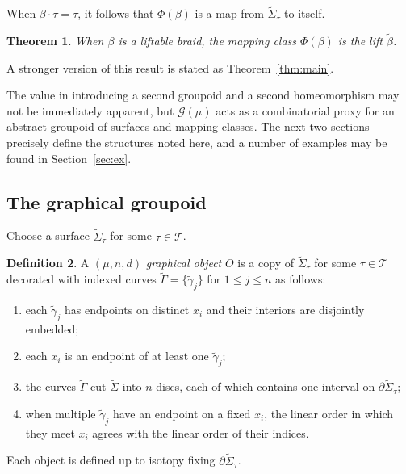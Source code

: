 \documentclass{amsart}
\newtheorem{theorem}{Theorem}[section]
\theoremstyle{definition}
\newtheorem{definition}[theorem]{Definition}
\def\ws{\widetilde{\Sigma}}
\begin{document}
When $\beta\cdot \tau=\tau$, it follows that $\Phi(\beta)$ is a map from $\ws_\tau$ to itself. 



\begin{theorem}\label{thm:premain} When $\beta$ is a liftable braid,  the mapping class $\Phi(\beta)$ is the lift $\widetilde{\beta}$.
\end{theorem} 

A stronger version of this result is stated as Theorem~\ref{thm:main}.

The value in introducing a second groupoid and a second homeomorphism may not be immediately apparent, but $\mathcal{G}(\mu)$ acts as a combinatorial proxy for an abstract groupoid of surfaces and mapping classes.  The next two sections precisely define the structures noted here, and a number of examples may be found in Section~\ref{sec:ex}.






\subsection{The graphical groupoid}\label{sec:gobj}

Choose a surface $\ws_\tau$ for some $\tau\in\mathcal{T}$.


\begin{definition}\label{def:graphobj}  A $(\mu, n, d)$ \textit{graphical object} $O$ is a copy of $\ws_\tau$ for some $\tau\in \mathcal{T}$ decorated with indexed curves $\widetilde\Gamma=\{\widetilde{\gamma}_j\}$ for $1\leq j\leq n$ as follows:
\begin{enumerate}
\item\label{cond1} each $\widetilde{\gamma}_j$ has endpoints on distinct $x_i$ and their interiors are disjointly embedded;
\item each $x_i$ is an endpoint of at least one $\widetilde{\gamma}_j$;
\item\label{disc} the curves $\widetilde\Gamma$ cut $\ws$ into $n$ discs, each of which contains one interval on $\partial \ws_\tau$;
\item\label{cond4} when multiple $\widetilde{\gamma}_j$ have an endpoint on a fixed $x_i$, the linear order in which they meet $x_i$ agrees with the linear order of their indices.
\end{enumerate}

Each object is defined up to isotopy fixing  $\partial \ws_\tau$.
\end{definition}
\end{document}

